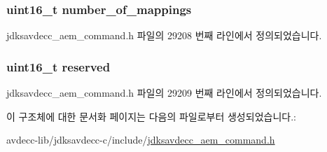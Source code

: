 \subsubsection[{\texorpdfstring{number\+\_\+of\+\_\+mappings}{number_of_mappings}}]{\setlength{\rightskip}{0pt plus 5cm}uint16\+\_\+t number\+\_\+of\+\_\+mappings}\hypertarget{structjdksavdecc__aem__command__remove__audio__mappings__response_ac7db472c5622ef473d5d0a5c416d5531}{}\label{structjdksavdecc__aem__command__remove__audio__mappings__response_ac7db472c5622ef473d5d0a5c416d5531}


jdksavdecc\+\_\+aem\+\_\+command.\+h 파일의 29208 번째 라인에서 정의되었습니다.

\subsubsection[{\texorpdfstring{reserved}{reserved}}]{\setlength{\rightskip}{0pt plus 5cm}uint16\+\_\+t reserved}\hypertarget{structjdksavdecc__aem__command__remove__audio__mappings__response_a5a6ed8c04a3db86066924b1a1bf4dad3}{}\label{structjdksavdecc__aem__command__remove__audio__mappings__response_a5a6ed8c04a3db86066924b1a1bf4dad3}


jdksavdecc\+\_\+aem\+\_\+command.\+h 파일의 29209 번째 라인에서 정의되었습니다.



이 구조체에 대한 문서화 페이지는 다음의 파일로부터 생성되었습니다.\+:\begin{DoxyCompactItemize}
\item 
avdecc-\/lib/jdksavdecc-\/c/include/\hyperlink{jdksavdecc__aem__command_8h}{jdksavdecc\+\_\+aem\+\_\+command.\+h}\end{DoxyCompactItemize}
